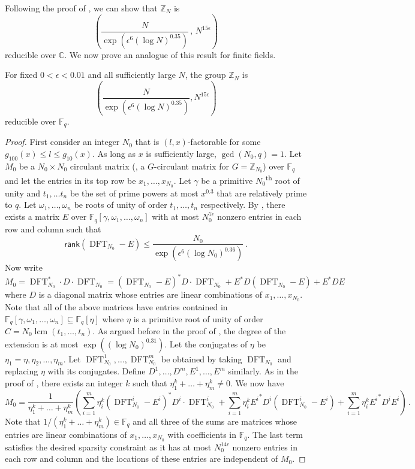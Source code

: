 \documentclass{toc}
\newcommand\F{{\mathbb{F}}}
\renewcommand\Z{{\mathbb{Z}}}
\renewcommand\C{{\mathbb{C}}}
\newcommand\rank{\textsf{rank}}
\DeclareMathOperator{\lcm}{lcm}
\newcommand{\ts}{\textsuperscript}
\DeclareMathOperator{\DFT}{DFT}
\begin{document}
Following the proof of , 
we can show that $\Z_N$ is 
\[
\left(\frac{N}{\exp\left(\epsilon^6(\log N)^{0.35}\right)}\,,\,N^{15 \epsilon} \right)
\]
reducible over $\C$.  We now prove an analogue of this result for finite fields.
\begin{claim}\label{main_stronger}
For fixed $0 < \epsilon < 0.01$ and all sufficiently large $N$, the group $\Z_N$ is
\[
\left( \frac{N}{\exp\left(\epsilon^6(\log N)^{0.35}\right)},  N^{15 \epsilon}\right) 
\]
reducible over $\F_q$.
\end{claim}
\begin{proof}
  First consider an integer $N_0$ that is $(l,x)$-factorable for some $
g_{100}(x) \leq l \leq g_{10}(x)$.  As long as $x$ is sufficiently large, $\gcd(N_0,q) = 1$.  Let $M_0$ be a $N_0 \times N_0$ circulant matrix (\ie, a
%
$G$-circulant    %
matrix for
%
$G=\Z_{N_0}$)  %
over $\F_q$ and 
%
let the entries in its top row be %
$x_1, \dots , x_{N_0}$.  Let $\gamma$ be a primitive $N_0$\ts{th} root of unity and $t_1, \dots t_n$ be the set of prime powers at most $x^{0.3}$ that are relatively prime to $q$.  Let $\omega_1, \dots , \omega_n$ be roots of unity of order $t_1, \dots , t_n$ respectively.  By , there exists a matrix $E$ over $\F_q[\gamma, \omega_1, \dots , \omega_n]$ with at most $N_0^{7\epsilon}$ nonzero entries in each row and column such that 
%
%
%
%
\[
\rank(\DFT_{N_0} - E) \leq \frac{N_0}{\exp\left(\epsilon^6(\log N_0)^{0.36}\right)} \,.
\]
%
Now write
%
%
%
%
\[
M_0 = \DFT_{N_0}^* \cdot D \cdot \DFT_{N_0} = (\DFT_{N_0} - E)^*  D \cdot \DFT_{N_0} + E^*D(\DFT_{N_0} - E) + E^*DE
\]
%
where $D$ is a diagonal matrix whose entries are linear combinations of $x_1,\dots , x_{N_0}$.  Note that all of the above matrices have entries contained in $\F_q[\gamma, \omega_1, \dots , \omega_n] \subseteq \F_q[\eta]$ where $\eta$ is a primitive root of unity of order $C = N_0\lcm(t_1, \dots , t_n)$.  As argued before in the proof of , the degree of the extension is at most $\exp\left((\log N_0)^{0.31}\right)$.  Let the conjugates of $\eta$ be $\eta_1 = \eta, \eta_2, \dots , \eta_m$.  Let %
$\DFT_{N_0}^1, \dots , \DFT_{N_0}^m$ 
%
be obtained by taking %
$\DFT_{N_0}$ %
and replacing $\eta$ with its conjugates. Define $D^1, \dots , D^m, E^1, \dots , E^m$ similarly.  As in the proof of , there exists an integer $k$ such that $\eta_1^k +  \dots + \eta_m^k \neq 0$.  We now have
%
%
%
%
\[
M_0 = \frac{1}{\eta_1^k + \dots + \eta_m^k}\left(\sum_{i=1}^m \eta_i^k(\DFT_{N_0}^i - E^i)^*D^i \cdot \DFT_{N_0}^i + \sum_{i=1}^m \eta_i^k{E^i}^*D^i(\DFT_{N_0}^i - E^i) + \sum_{i=1}^m \eta_i^k{E^i}^*D^iE^i\right) \,.
\]
%
Note that $1/(\eta_1^k + \dots + \eta_m^k) \in \F_q$ and all three of the sums are matrices whose entries are linear combinations of $x_1, \dots , x_{N_0}$ with coefficients in $\F_q$.  The last term satisfies the desired sparsity constraint as it has at most $N_0^{14 \epsilon}$ nonzero entries in each row and column and the locations of these entries are independent of $M_0$.  


\end{proof}
\end{document}
